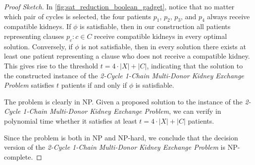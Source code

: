 \begin{proof}[Proof Sketch]
In \autoref{fig:sat_reduction_boolean_gadget}, notice that no matter which pair of cycles is selected, the four patients $p_1$, $p_2$, $p_3$, and $p_4$ always receive compatible kidneys. If $\phi$ is satisfiable, then in our construction all patients representing clauses ${ p_c : c \in C }$ receive compatible kidneys in every optimal solution. Conversely, if $\phi$ is not satisfiable, then in every solution there exists at least one patient representing a clause who does not receive a compatible kidney. This gives rise to the threshold $t = 4 \cdot |X| + |C|$, indicating that the solution to the constructed instance of the \textit{2-Cycle 1-Chain Multi-Donor Kidney Exchange Problem} satisfies $t$ patients if and only if $\phi$ is satisfiable.

The problem is clearly in NP. Given a proposed solution to the instance of the \textit{2-Cycle 1-Chain Multi-Donor Kidney Exchange Problem}, we can verify in polynomial time whether it satisfies at least $t = 4 \cdot |X| + |C|$ patients. 

Since the problem is both in NP and NP-hard, we conclude that the decision version of the \textit{2-Cycle 1-Chain Multi-Donor Kidney Exchange Problem} is NP-complete.
\end{proof}


